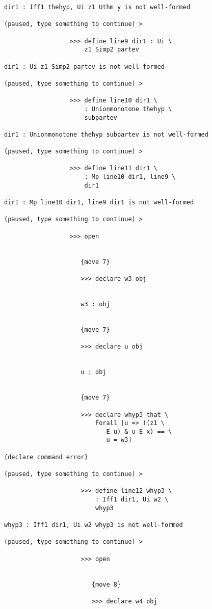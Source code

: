 \documentclass[12pt]{article}
\begin{document}
\begin{verbatim}
dir1 : Iff1 thehyp, Ui z1 Uthm y is not well-formed

(paused, type something to continue) >

                  >>> define line9 dir1 : Ui \
                      z1 Simp2 partev

dir1 : Ui z1 Simp2 partev is not well-formed

(paused, type something to continue) >

                  >>> define line10 dir1 \
                      : Unionmonotone thehyp \
                      subpartev

dir1 : Unionmonotone thehyp subpartev is not well-formed

(paused, type something to continue) >

                  >>> define line11 dir1 \
                      : Mp line10 dir1, line9 \
                      dir1

dir1 : Mp line10 dir1, line9 dir1 is not well-formed

(paused, type something to continue) >

                  >>> open


                     {move 7}

                     >>> declare w3 obj


                     w3 : obj


                     {move 7}

                     >>> declare u obj


                     u : obj


                     {move 7}

                     >>> declare whyp3 that \
                         Forall [u => ((z1 \
                            E u) & u E x) == \
                            u = w3]

{declare command error}

(paused, type something to continue) >

                     >>> define line12 whyp3 \
                         : Iff1 dir1, Ui w2 \
                         whyp3

whyp3 : Iff1 dir1, Ui w2 whyp3 is not well-formed

(paused, type something to continue) >

                     >>> open


                        {move 8}

                        >>> declare w4 obj



\end{verbatim}
\end{document}

